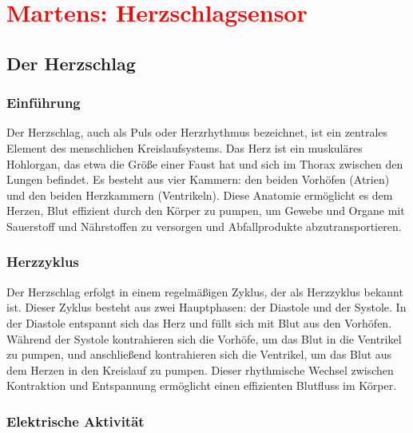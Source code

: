 %
%
%

\chapter{\textcolor{red}{Martens: Herzschlagsensor}}

\section{Der Herzschlag}
{
    \subsection{Einführung}

    Der Herzschlag, auch als Puls oder Herzrhythmus bezeichnet, ist ein zentrales Element des menschlichen Kreislaufsystems. Das Herz ist ein muskuläres Hohlorgan, das etwa die Größe einer Faust hat und sich im Thorax zwischen den Lungen befindet. Es besteht aus vier Kammern: den beiden Vorhöfen (Atrien) und den beiden Herzkammern (Ventrikeln). Diese Anatomie ermöglicht es dem Herzen, Blut effizient durch den Körper zu pumpen, um Gewebe und Organe mit Sauerstoff und Nährstoffen zu versorgen und Abfallprodukte abzutransportieren. \cite{Gesenberg:2017}
    
    \subsection{Herzzyklus}

    Der Herzschlag erfolgt in einem regelmäßigen Zyklus, der als Herzzyklus bekannt ist. Dieser Zyklus besteht aus zwei Hauptphasen: der Diastole und der Systole. In der Diastole entspannt sich das Herz und füllt sich mit Blut aus den Vorhöfen. Während der Systole kontrahieren sich die Vorhöfe, um das Blut in die Ventrikel zu pumpen, und anschließend kontrahieren sich die Ventrikel, um das Blut aus dem Herzen in den Kreislauf zu pumpen. Dieser rhythmische Wechsel zwischen Kontraktion und Entspannung ermöglicht einen effizienten Blutfluss im Körper. \cite{Gesenberg:2017}
    
    \subsection{Elektrische Aktivität}
    
}
